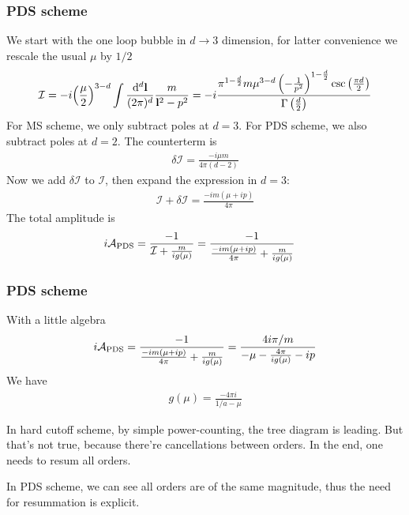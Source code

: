 \begin{frame}
	\frametitle{PDS scheme~\parencite{Kaplan:1998tg}}

	We start with the one loop bubble in $d\to3$ dimension, for latter convenience we rescale the usual $\mu$ by $1/2$
	\begin{align}
		\mathcal{I}=-i\pqty{\frac{\mu}{2}}^{3-d}\int\mmd[d]{\vb{l}}\frac{m}{\vb{l}^2-p^2}=-i\frac{ \pi ^{1-\frac{d}{2}} m \mu ^{3-d} \left(-\frac{1}{p^2}\right)^{1-\frac{d}{2}} \csc \left(\frac{\pi  d}{2}\right)}{\Gamma \left(\frac{d}{2}\right)}
	\end{align}
	For MS scheme, we only subtract poles at $d=3$. For PDS scheme, we also subtract poles at $d=2$. The counterterm is 
	\begin{align}
		\delta \mathcal{I}=\frac{-i\mu m }{4 \pi(d-2)}
	\end{align}
	Now we add $\delta \mathcal{I}$ to $\mathcal{I}$, then expand the expression in $d=3$: 
	\begin{align*}
		\mathcal{I}+\delta \mathcal{I}=\frac{-im(\mu+i p)}{4 \pi}
	\end{align*}
	The total amplitude is
	\begin{align}
		i\mathcal{A}_{\mathrm{PDS}} & =\frac{-1}{\mathcal{I}+\frac{m}{ig(\mu)}}=\frac{-1}{\frac{-im(\mu+i p)}{4 \pi}+\frac{m}{ig(\mu)}}
	\end{align}
\end{frame}
\begin{frame}
	\frametitle{PDS scheme}

	With a little algebra
	\begin{align*}
		i\mathcal{A}_{\mathrm{PDS}}=\frac{-1}{\frac{-im(\mu+i p)}{4 \pi}+\frac{m}{ig(\mu)}}=\frac{4i\pi/m}{-\mu-\frac{4\pi}{ig(\mu)}-ip}
	\end{align*}
	We have
	\begin{align}
		g(\mu)=\frac{-4\pi i}{1/a-\mu}
	\end{align}

	In hard cutoff scheme, by simple power-counting, the tree diagram is leading. But that's not true, because there're cancellations between orders. In the end, one needs to resum all orders. 

	In PDS scheme, we can see all orders are of the same magnitude, thus the need for resummation is explicit. 
\end{frame}


\printbibliography

% 
% 

